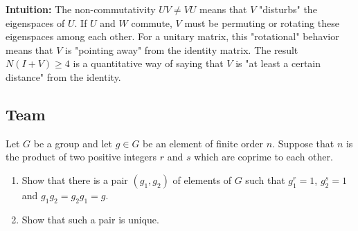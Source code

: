 \begin{solution}
\textbf{Intuition:}
The non-commutativity $UV \neq VU$ means that $V$ "disturbs" the eigenspaces of $U$. If $U$ and $W$ commute, $V$ must be permuting or rotating these eigenspaces among each other. For a unitary matrix, this "rotational" behavior means that $V$ is "pointing away" from the identity matrix. The result $N(I+V) \geq 4$ is a quantitative way of saying that $V$ is "at least a certain distance" from the identity.
\end{solution}


\subsection{Team}

\begin{exercise}
\label{algebra:2017:6}
Let $G$ be a group and let $g \in G$ be an element of finite order $n$. Suppose that $n$ is the product of two positive integers $r$ and $s$ which are coprime to each other.
\begin{enumerate}
    \item Show that there is a pair $(g_1, g_2)$ of elements of $G$ such that $g_1^r = 1$, $g_2^s = 1$ and $g_1 g_2 = g_2 g_1 = g$.
    \item Show that such a pair is unique.
\end{enumerate}
\end{exercise}

